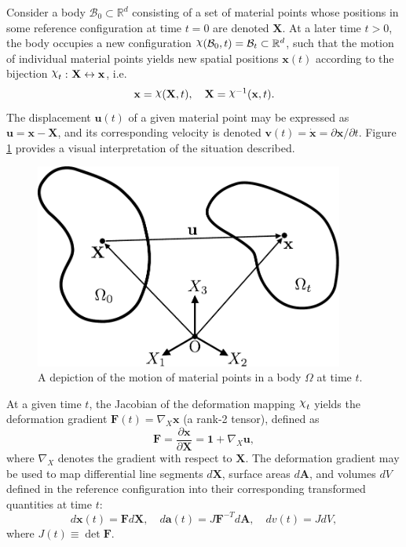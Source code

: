 Consider a body $\mathcal{B}_0 \subset \mathbb{R}^d$ consisting of a set of material points whose positions in some reference configuration at time $t = 0$ are denoted $\mathbf{X}$. At a later time $t > 0$, the body occupies a new configuration $\raisebox{\depth}{$\chi$} (\mathcal{B}_0, t) = \mathcal{B}_t \subset \mathbb{R}^d$, such that the motion of individual material points yields new spatial positions $\mathbf{x} (t)$ according to the bijection $\raisebox{\depth}{$\chi$}_t \, \colon \mathbf{X} \leftrightarrow \mathbf{x}$, i.e.
\begin{equation}
  \mathbf{x} = \raisebox{\depth}{$\chi$} (\mathbf{X}, t), \quad \mathbf{X} = \raisebox{\depth}{$\chi$}^{-1} (\mathbf{x}, t).
\end{equation}
The displacement $\mathbf{u} (t)$ of a given material point may be expressed as $\mathbf{u} = \mathbf{x} - \mathbf{X}$, and its corresponding velocity is denoted $\mathbf{v} (t) = \dot{\mathbf{x}} = \partial \mathbf{x} / \partial t$. Figure \ref{fig:kinematics} provides a visual interpretation of the situation described.
\begin{figure}[!h]
  \centering
  \includegraphics[width=4.0in]{figures/kinematics.pdf}
  \caption{A depiction of the motion of material points in a body $\Omega$ at time $t$.}
  \label{fig:kinematics}
\end{figure}

At a given time $t$, the Jacobian of the deformation mapping $\raisebox{\depth}{$\chi$}_t$ yields the deformation gradient $\mathbf{F} (t) = \nabla_X \mathbf{x}$ (a rank-2 tensor), defined as
\begin{equation}
  \mathbf{F} = \frac{\partial \mathbf{x}}{\partial \mathbf{X}} = \mathbf{1} + \nabla_X \mathbf{u},
\end{equation}
where $\nabla_X$ denotes the gradient with respect to $\mathbf{X}$. The deformation gradient may be used to map differential line segments $d \mathbf{X}$, surface areas $d \mathbf{A}$, and volumes $d V$ defined in the reference configuration into their corresponding transformed quantities at time $t$:
\begin{equation}
  d \mathbf{x}(t) = \mathbf{F} d \mathbf{X}, \quad d \mathbf{a}(t) = J \mathbf{F}^{-T} d \mathbf{A}, \quad d v(t) = J d V,
\end{equation}
where $J(t) \equiv \det{\mathbf{F}}$.

